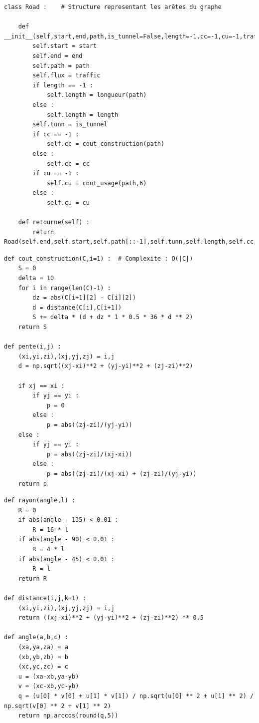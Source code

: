\documentclass{beamer}[11pt]
\begin{document}
		\begin{frame}[containsverbatim]
\begin{lstlisting}
class Road :	# Structure representant les arêtes du graphe

    def __init__(self,start,end,path,is_tunnel=False,length=-1,cc=-1,cu=-1,traffic=0,i=1):
        self.start = start
        self.end = end
        self.path = path
        self.flux = traffic
        if length == -1 :
            self.length = longueur(path)
        else :
            self.length = length
        self.tunn = is_tunnel
        if cc == -1 :
            self.cc = cout_construction(path)
        else :
            self.cc = cc
        if cu == -1 :
            self.cu = cout_usage(path,6)
        else :
            self.cu = cu

    def retourne(self) :
        return Road(self.end,self.start,self.path[::-1],self.tunn,self.length,self.cc,self.cu,self.flux)
\end{lstlisting}
		\end{frame}

		\begin{frame}[containsverbatim]
\begin{lstlisting}
def cout_construction(C,i=1) :	# Complexite : O(|C|)
    S = 0
    delta = 10
    for i in range(len(C)-1) :
        dz = abs(C[i+1][2] - C[i][2])
        d = distance(C[i],C[i+1])
        S += delta * (d + dz * 1 * 0.5 * 36 * d ** 2)
    return S

def pente(i,j) :
    (xi,yi,zi),(xj,yj,zj) = i,j
    d = np.sqrt((xj-xi)**2 + (yj-yi)**2 + (zj-zi)**2)

    if xj == xi :
        if yj == yi :
            p = 0
        else :
            p = abs((zj-zi)/(yj-yi))
    else :
        if yj == yi :
            p = abs((zj-zi)/(xj-xi))
        else :
            p = abs((zj-zi)/(xj-xi) + (zj-zi)/(yj-yi))
    return p
\end{lstlisting}
		\end{frame}

		\begin{frame}[containsverbatim]
\begin{lstlisting}
def rayon(angle,l) :
    R = 0
    if abs(angle - 135) < 0.01 :
        R = 16 * l
    if abs(angle - 90) < 0.01 :
        R = 4 * l
    if abs(angle - 45) < 0.01 :
        R = l
    return R

def distance(i,j,k=1) :
    (xi,yi,zi),(xj,yj,zj) = i,j
    return ((xj-xi)**2 + (yj-yi)**2 + (zj-zi)**2) ** 0.5

def angle(a,b,c) :
    (xa,ya,za) = a
    (xb,yb,zb) = b
    (xc,yc,zc) = c
    u = (xa-xb,ya-yb)
    v = (xc-xb,yc-yb)
    q = (u[0] * v[0] + u[1] * v[1]) / np.sqrt(u[0] ** 2 + u[1] ** 2) / np.sqrt(v[0] ** 2 + v[1] ** 2)
    return np.arccos(round(q,5))
\end{lstlisting}
		\end{frame}
\end{document}

